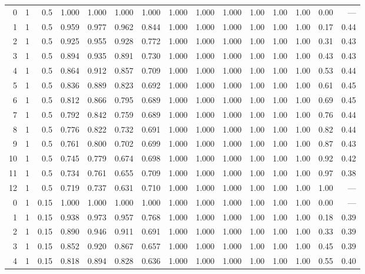 \begin{landscape}
\begin{longtable}{rrrrrrrrrrrrrrr}
0 & 1 & 0.5 & 1.000 & 1.000 & 1.000 & 1.000 & 1.000 & 1.000 & 1.000 & 1.00 & 1.00 & 1.00 & 0.00 & --- \\
1 & 1 & 0.5 & 0.959 & 0.977 & 0.962 & 0.844 & 1.000 & 1.000 & 1.000 & 1.00 & 1.00 & 1.00 & 0.17 & 0.44 \\
2 & 1 & 0.5 & 0.925 & 0.955 & 0.928 & 0.772 & 1.000 & 1.000 & 1.000 & 1.00 & 1.00 & 1.00 & 0.31 & 0.43 \\
3 & 1 & 0.5 & 0.894 & 0.935 & 0.891 & 0.730 & 1.000 & 1.000 & 1.000 & 1.00 & 1.00 & 1.00 & 0.43 & 0.43 \\
4 & 1 & 0.5 & 0.864 & 0.912 & 0.857 & 0.709 & 1.000 & 1.000 & 1.000 & 1.00 & 1.00 & 1.00 & 0.53 & 0.44 \\
5 & 1 & 0.5 & 0.836 & 0.889 & 0.823 & 0.692 & 1.000 & 1.000 & 1.000 & 1.00 & 1.00 & 1.00 & 0.61 & 0.45 \\
6 & 1 & 0.5 & 0.812 & 0.866 & 0.795 & 0.689 & 1.000 & 1.000 & 1.000 & 1.00 & 1.00 & 1.00 & 0.69 & 0.45 \\
7 & 1 & 0.5 & 0.792 & 0.842 & 0.759 & 0.689 & 1.000 & 1.000 & 1.000 & 1.00 & 1.00 & 1.00 & 0.76 & 0.44 \\
8 & 1 & 0.5 & 0.776 & 0.822 & 0.732 & 0.691 & 1.000 & 1.000 & 1.000 & 1.00 & 1.00 & 1.00 & 0.82 & 0.44 \\
9 & 1 & 0.5 & 0.761 & 0.800 & 0.702 & 0.699 & 1.000 & 1.000 & 1.000 & 1.00 & 1.00 & 1.00 & 0.87 & 0.43 \\
10 & 1 & 0.5 & 0.745 & 0.779 & 0.674 & 0.698 & 1.000 & 1.000 & 1.000 & 1.00 & 1.00 & 1.00 & 0.92 & 0.42 \\
11 & 1 & 0.5 & 0.734 & 0.761 & 0.655 & 0.709 & 1.000 & 1.000 & 1.000 & 1.00 & 1.00 & 1.00 & 0.97 & 0.38 \\
12 & 1 & 0.5 & 0.719 & 0.737 & 0.631 & 0.710 & 1.000 & 1.000 & 1.000 & 1.00 & 1.00 & 1.00 & 1.00 & --- \\
\midrule
0 & 1 & 0.15 & 1.000 & 1.000 & 1.000 & 1.000 & 1.000 & 1.000 & 1.000 & 1.00 & 1.00 & 1.00 & 0.00 & --- \\
1 & 1 & 0.15 & 0.938 & 0.973 & 0.957 & 0.768 & 1.000 & 1.000 & 1.000 & 1.00 & 1.00 & 1.00 & 0.18 & 0.39 \\
2 & 1 & 0.15 & 0.890 & 0.946 & 0.911 & 0.691 & 1.000 & 1.000 & 1.000 & 1.00 & 1.00 & 1.00 & 0.33 & 0.39 \\
3 & 1 & 0.15 & 0.852 & 0.920 & 0.867 & 0.657 & 1.000 & 1.000 & 1.000 & 1.00 & 1.00 & 1.00 & 0.45 & 0.39 \\
4 & 1 & 0.15 & 0.818 & 0.894 & 0.828 & 0.636 & 1.000 & 1.000 & 1.000 & 1.00 & 1.00 & 1.00 & 0.55 & 0.40 \\

\end{longtable}
\end{landscape}
